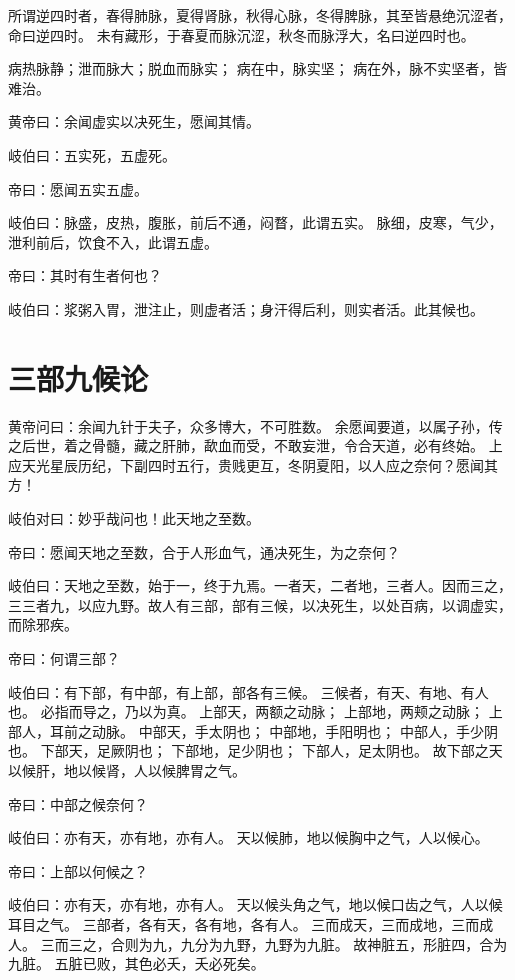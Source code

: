 \documentclass{article}%
\begin{document}
所谓逆四时者，春得肺脉，夏得肾脉，秋得心脉，冬得脾脉，其至皆悬绝沉涩者，命曰逆四时。
未有藏形，于春夏而脉沉涩，秋冬而脉浮大，名曰逆四时也。

病热脉静；泄而脉大；脱血而脉实；
病在中，脉实坚；
病在外，脉不实坚者，皆难治。

黄帝曰：余闻虚实以决死生，愿闻其情。

岐伯曰：五实死，五虚死。

帝曰：愿闻五实五虚。

岐伯曰：脉盛，皮热，腹胀，前后不通，闷瞀，此谓五实。
脉细，皮寒，气少，泄利前后，饮食不入，此谓五虚。

帝曰：其时有生者何也？

岐伯曰：浆粥入胃，泄注止，则虚者活；身汗得后利，则实者活。此其候也。


\section{三部九候论}
黄帝问曰：余闻九针于夫子，众多博大，不可胜数。
余愿闻要道，以属子孙，传之后世，着之骨髓，藏之肝肺，歃血而受，不敢妄泄，令合天道，必有终始。
上应天光星辰历纪，下副四时五行，贵贱更互，冬阴夏阳，以人应之奈何？愿闻其方！

岐伯对曰：妙乎哉问也！此天地之至数。

帝曰：愿闻天地之至数，合于人形血气，通决死生，为之奈何？

岐伯曰：天地之至数，始于一，终于九焉。一者天，二者地，三者人。因而三之，三三者九，以应九野。故人有三部，部有三候，以决死生，以处百病，以调虚实，而除邪疾。

帝曰：何谓三部？

岐伯曰：有下部，有中部，有上部，部各有三候。
三候者，有天、有地、有人也。
必指而导之，乃以为真。
上部天，两额之动脉；
上部地，两颊之动脉；
上部人，耳前之动脉。
中部天，手太阴也；
中部地，手阳明也；
中部人，手少阴也。
下部天，足厥阴也；
下部地，足少阴也；
下部人，足太阴也。
故下部之天以候肝，地以候肾，人以候脾胃之气。

帝曰：中部之候奈何？

岐伯曰：亦有天，亦有地，亦有人。
天以候肺，地以候胸中之气，人以候心。

帝曰：上部以何候之？

岐伯曰：亦有天，亦有地，亦有人。
天以候头角之气，地以候口齿之气，人以候耳目之气。
三部者，各有天，各有地，各有人。
三而成天，三而成地，三而成人。
三而三之，合则为九，九分为九野，九野为九脏。
故神脏五，形脏四，合为九脏。
五脏已败，其色必夭，夭必死矣。
\end{document}
